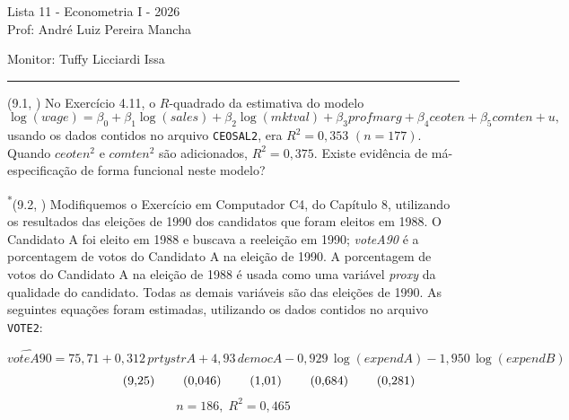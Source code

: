 \documentclass[12pt,letterpaper, onecolumn]{exam}
\begin{document}
\begingroup
    \centering
    \LARGE Lista 11 - Econometria I - 2026\\[0.5em]
    \large Prof: André Luiz Pereira Mancha \par
    \large Monitor: Tuffy Licciardi Issa \par
\endgroup
\rule{\textwidth}{0.4pt}
\pointsdroppedatright
\printanswers
\renewcommand{\solutiontitle}{\noindent\textbf{Ans:}\enspace}
\newcommand{\qstar}{\hspace{-0.6em}\textsuperscript{*}\hspace{0.2em}}

\begin{questions}

\question (9.1, \citep{wooldridge2016}) No Exercício 4.11, o \(R\)-quadrado da estimativa do modelo
\[
\log(wage)=\beta_0+\beta_1\log(sales)+\beta_2\log(mktval)+\beta_3 profmarg+\beta_4 ceoten+\beta_5 comten+u,
\]
usando os dados contidos no arquivo \texttt{CEOSAL2}, era \(R^2=0{,}353\) \((n=177)\). Quando \(ceoten^2\) e \(comten^2\) são adicionados, \(R^2=0{,}375\). Existe evidência de má-especificação de forma funcional neste modelo?

\vspace{0.7cm}

\question\qstar (9.2, \citep{wooldridge2016}) Modifiquemos o Exercício em Computador C4, do Capítulo 8, utilizando os resultados das eleições de 1990 dos candidatos que foram eleitos em 1988. O Candidato A foi eleito em 1988 e buscava a reeleição em 1990; \textit{voteA90} é a porcentagem de votos do Candidato A na eleição de 1990. A porcentagem de votos do Candidato A na eleição de 1988 é usada como uma variável \textit{proxy} da qualidade do candidato. Todas as demais variáveis são das eleições de 1990. As seguintes equações foram estimadas, utilizando os dados contidos no arquivo \texttt{VOTE2}:

\[
\widehat{voteA90}=75{,}71+0{,}312\,prtystrA+4{,}93\,democA-0{,}929\,\log(expendA)-1{,}950\,\log(expendB)
\]
\[
\hspace{2.0cm}(9{,}25)\hspace{0.8cm}(0{,}046)\hspace{0.8cm}(1{,}01)\hspace{0.8cm}(0{,}684)\hspace{0.8cm}(0{,}281)
\]
\[
n=186,\; R^2=0{,}465
\]


\end{questions}
\end{document}
